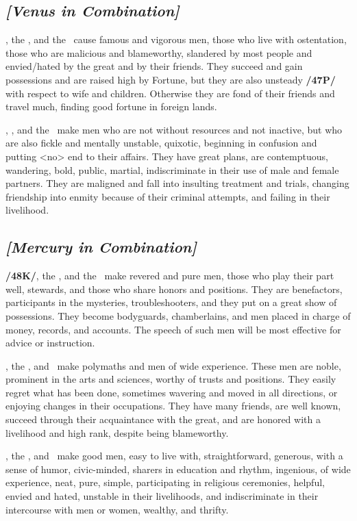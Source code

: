 \secbr
{}
\subsection{\textit{[Venus in Combination]}}
\Venus, the \Sun, and the \Moon\, cause famous and vigorous men, those who live with ostentation, those who are malicious and blameworthy, slandered by most people and envied/hated by the great and by their friends. They succeed and gain possessions and are raised high by Fortune, but they are also unsteady
\textbf{/47P/} with respect to wife and children. Otherwise they are fond of their friends and travel much, finding
good fortune in foreign lands.

\Venus, \Mars, and the \Moon\, make men who are not without resources and not inactive, but who are also fickle and mentally unstable, quixotic, beginning in confusion and putting <no> end to their affairs. They have great plans, are contemptuous, wandering, bold, public, martial, indiscriminate in their use of male and female partners. They are maligned and fall into insulting treatment and trials, changing friendship into enmity because of their criminal attempts, and failing in their livelihood.

\secbr
{}
\subsection{\textit{[Mercury in Combination]}}
\textbf{/48K/}\Mercury, the \Sun, and the \Moon\, make revered and pure men, those who play their part well, stewards, and those who share honors and positions. They are benefactors, participants in the mysteries, troubleshooters, and they put on a great show of possessions. They become bodyguards, chamberlains, and men placed in charge of money, records, and accounts. The speech of such men will be most effective for advice or instruction.

\Mercury, the \Sun, and \Venus\, make polymaths and men of wide experience. These men are noble, prominent in the arts and sciences, worthy of trusts and positions. They easily regret what has been done, sometimes wavering and moved in all directions, or enjoying changes in their occupations. They have many friends, are well known, succeed through their acquaintance with the great, and are honored with a livelihood and high rank, despite being blameworthy.

\Mercury, the \Moon, and \Venus\, make good men, easy to live with, straightforward, generous, with a sense of humor, civic-minded, sharers in education and rhythm, ingenious, of wide experience, neat, pure, simple, participating in religious ceremonies, helpful, envied and hated, unstable in their livelihoods, and indiscriminate in their intercourse with men or women, wealthy, and thrifty.

